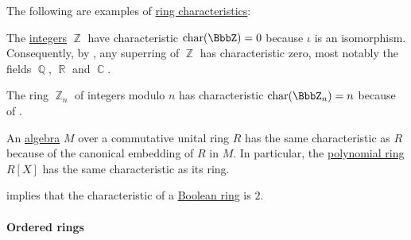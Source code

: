 \begin{example}\label{ex:def:ring_characteristic}
  The following are examples of \hyperref[def:ring_characteristic]{ring characteristics}:
  \begin{thmenum}
     The \hyperref[def:integers]{integers} \( \BbbZ \) have characteristic \( \op{char}(\BbbZ) = 0 \) because \( \iota \) is an isomorphism. Consequently, by , any superring of \( \BbbZ \) has characteristic zero, most notably the fields \( \BbbQ \), \( \BbbR \) and \( \BbbC \).

     The ring \hyperref[def:ring_of_integers_modulo]{\( \BbbZ_n \)} of integers modulo \( n \) has characteristic \( \op{char}(\BbbZ_n) = n \) because of .

     An \hyperref[def:algebra_over_semiring]{algebra} \( M \) over a commutative unital ring \( R \) has the same characteristic as \( R \) because of the canonical embedding of \( R \) in \( M \). In particular, the \hyperref[def:polynomial_algebra]{polynomial ring} \( R[X] \) has the same characteristic as its ring.

      implies that the characteristic of a \hyperref[def:boolean_ring]{Boolean ring} is \( 2 \).
  \end{thmenum}
\end{example}

\paragraph{Ordered rings}

